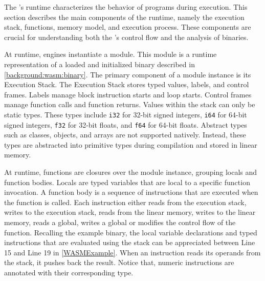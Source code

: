 \label{background:wasm:execution}

The \Wasm's runtime characterizes the behavior of \Wasm programs during execution. 
This section describes the main components of the \Wasm runtime, namely the execution stack, functions, memory model, and execution process. 
These components are crucial for understanding both the \Wasm's control flow and the analysis of \Wasm binaries.


 At runtime, \Wasm engines instantiate a \Wasm module. 
This module is a runtime representation of a loaded and initialized \Wasm binary described in \autoref{background:wasm:binary}. 
The primary component of a module instance is its Execution Stack. 
The Execution Stack stores typed values, labels, and control frames. 
Labels manage block instruction starts and loop starts.
Control frames manage function calls and function returns.
Values within the stack can only be static types.
These types include \texttt{i32} for 32-bit signed integers, \texttt{i64} for 64-bit signed integers, \texttt{f32} for 32-bit floats, and \texttt{f64} for 64-bit floats. 
Abstract types such as classes, objects, and arrays are not supported natively. 
Instead, these types are abstracted into primitive types during compilation and stored in linear memory.


 At runtime, \Wasm functions are closures over the module instance, grouping locals and function bodies.
Locals are typed variables that are local to a specific function invocation.
A function body is a sequence of instructions that are executed when the function is called.
Each instruction either reads from the execution stack, writes to the execution stack, reads from the linear memory, writes to the linear memory, reads a global, writes a global or modifies the control flow of the function.
Recalling the example \Wasm binary, the local variable declarations and typed instructions that are evaluated using the stack can be appreciated between Line 15 and Line 19 in \autoref{WASMExample}. 
When an instruction reads its operands from the stack, it pushes back the result. 
Notice that, numeric instructions are annotated with their corresponding type.


